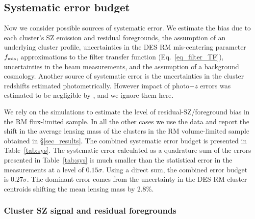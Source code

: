 \subsection{Systematic error budget}\label{mqe_sec_systematics}

Now we consider possible sources of systematic error. %
 We estimate the bias due to each cluster's SZ emission and residual foregrounds, the assumption of an underlying cluster profile, uncertainties in the DES RM mis-centering parameter $f_{\rm mis}$, approximations to the filter transfer function (Eq.~\ref{eq_filter_TF}), uncertainties in the beam measurements, and the assumption of a background cosmology.
Another source of systematic error is the uncertainties in the cluster redshifts estimated photometrically.
However impact of photo$-z$ errors was estimated to be negligible by \cite{raghunathan17a}, and we ignore them here.

We rely on the \cite{sehgal10} simulations to estimate the level of residual-SZ/foreground bias in the RM \whichyear{} flux-limited sample.
In all the other cases we use the data and report the shift in the average lensing mass of the clusters in the RM \whichyear{} volume-limited sample obtained in \S\ref{sec_results}. %
The combined systematic error budget is presented in Table~\ref{tab:sys}.
The systematic error calculated as a quadrature sum of the errors presented in Table~\ref{tab:sys} is much smaller than the statistical error in the measurements at a level of $0.15\sigma$. 
Using a direct sum, the combined error budget is $0.27\sigma$.
The dominant error comes from the uncertainty in the DES RM cluster centroids shifting the mean lensing mass by 2.8\%. 


\subsubsection{Cluster SZ signal and residual foregrounds}\label{subsec_SZbias}

